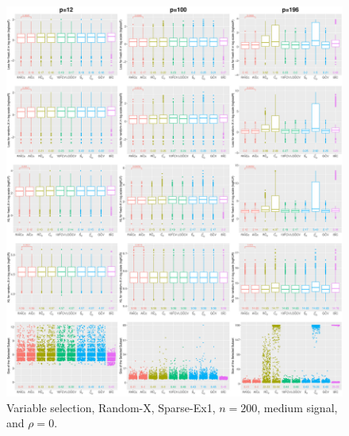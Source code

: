 \begin{figure}[!ht]
\centering
\includegraphics[width=\textwidth]{figures/supplement/randomx/subset_selection/Sparse-Ex1_n200_msnr_rho0.eps}
\caption{Variable selection, Random-X, Sparse-Ex1, $n=200$, medium signal, and $\rho=0$.}
\end{figure}
\clearpage
